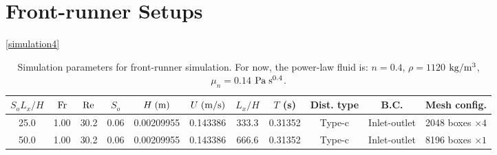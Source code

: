 \documentclass[a4paper]{article}
\newcommand{\fr}{{\rm{Fr}}}
\begin{document}
\section{Front-runner Setups}
\autoref{simulation4}

\begin{table}[htbp]
	\centering
	\begin{tabular}{ccccccccccc}
		$S_oL_x/H$ & $\fr$ & $\rm Re$ & $S_o$ & $H\;{\rm (m)}$ & $U\;{\rm (m/s)}$ & $L_x/H$ & $T$ (s) & Dist. type & B.C.  & Mesh config.\\
		\toprule
		25.0 & 1.00 & 30.2 & 0.06 & 0.00209955 & 0.143386 & 333.3 & 0.31352 & Type-c & Inlet-outlet & 2048 boxes $\times 4$\\
		50.0 & 1.00 & 30.2 & 0.06 & 0.00209955 & 0.143386 & 666.6 & 0.31352 & Type-c & Inlet-outlet & 8196 boxes $\times 1$\\
		\bottomrule 
	\end{tabular}
	\caption{Simulation parameters for front-runner simulation. For now, the power-law fluid is: $n=0.4$, $\rho=1120$ $\rm{kg/m^3}$, $\mu_n=0.14$ $\rm Pa\;s^{0.4}$.}
	\label{simulation4}
\end{table}
\end{document}
